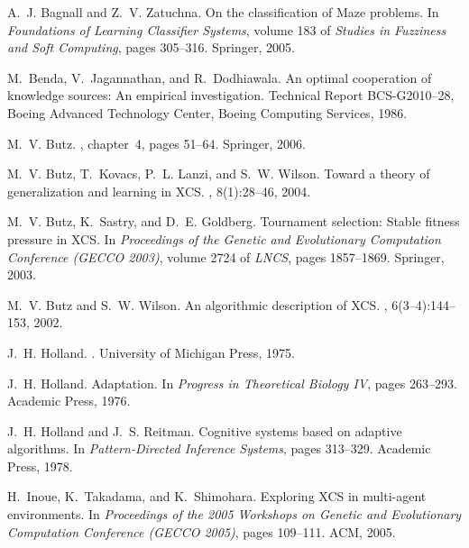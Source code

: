 \documentclass{sig-alternate}
\begin{document}

%
\begin{thebibliography}{10}
A.~J. Bagnall and Z.~V. Zatuchna.
\newblock On the classification of {M}aze problems.
\newblock In {\em Foundations of Learning Classifier Systems}, volume 183 of
  {\em Studies in Fuzziness and Soft Computing}, pages 305--316. Springer,
  2005.

M.~Benda, V.~Jagannathan, and R.~Dodhiawala.
\newblock An optimal cooperation of knowledge sources: {A}n empirical
  investigation.
\newblock Technical Report BCS-{\-}G2010--{\-}28, Boeing Advanced Technology
  Center, Boeing Computing Services, 1986.

M.~V. Butz.
, chapter~4, pages 51--64.
\newblock Springer, 2006.

M.~V. Butz, T.~Kovacs, P.~L. Lanzi, and S.~W. Wilson.
\newblock Toward a theory of generalization and learning in {XCS}.
, 8(1):28--46,
  2004.

M.~V. Butz, K.~Sastry, and D.~E. Goldberg.
\newblock Tournament selection: {S}table fitness pressure in {XCS}.
\newblock In {\em Proceedings of the Genetic and Evolutionary Computation
  Conference (GECCO 2003)}, volume 2724 of {\em LNCS}, pages 1857--1869.
  Springer, 2003.

M.~V. Butz and S.~W. Wilson.
\newblock An algorithmic description of {XCS}.
, 6(3--4):144--153, 2002.

J.~H. Holland.
.
\newblock University of Michigan Press, 1975.

J.~H. Holland.
\newblock Adaptation.
\newblock In {\em Progress in Theoretical Biology IV}, pages 263--293. Academic
  Press, 1976.

J.~H. Holland and J.~S. Reitman.
\newblock Cognitive systems based on adaptive algorithms.
\newblock In {\em Pattern-Directed Inference Systems}, pages 313--329. Academic
  Press, 1978.

H.~Inoue, K.~Takadama, and K.~Shimohara.
\newblock Exploring {XCS} in multi-agent environments.
\newblock In {\em Proceedings of the 2005 Workshops on Genetic and Evolutionary
  Computation Conference (GECCO 2005)}, pages 109--111. ACM, 2005.


\end{thebibliography}
\end{document}
